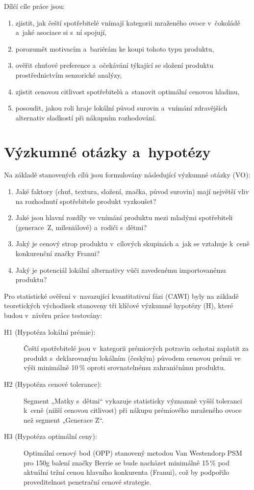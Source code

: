 Dílčí cíle práce jsou:
\begin{enumerate}
  \item zjistit, jak čeští spotřebitelé vnímají kategorii mraženého ovoce v~čokoládě a~jaké asociace si s~ní spojují,
  \item porozumět motivacím a~bariérám ke koupi tohoto typu produktu,
  \item ověřit chuťové preference a~očekávání týkající se složení produktu prostřednictvím senzorické analýzy,
  \item zjistit cenovou citlivost spotřebitelů a~stanovit optimální cenovou hladinu,
  \item posoudit, jakou roli hraje lokální původ surovin a~vnímání zdravějších alternativ sladkostí při nákupním rozhodování.
\end{enumerate}

\section{Výzkumné otázky a~hypotézy}
\label{sec:intro_rq_hyp}

Na základě stanovených cílů jsou formulovány následující výzkumné otázky (VO):
\begin{enumerate}
  \item[\textbf{VO1}] Jaké faktory (chuť, textura, složení, značka, původ surovin) mají největší vliv na rozhodnutí spotřebitele produkt vyzkoušet?
  \item[\textbf{VO2}] Jaké jsou hlavní rozdíly ve vnímání produktu mezi mladými spotřebiteli (generace~Z, mileniálové) a~rodiči s~dětmi?
  \item[\textbf{VO3}] Jaký je cenový strop produktu v~cílových skupinách a~jak se vztahuje k~ceně konkurenční značky Franui?
  \item[\textbf{VO4}] Jaký je potenciál lokální alternativy vůči zavedenému importovanému produktu?
\end{enumerate}

Pro statistické ověření v~navazující kvantitativní fázi (CAWI) byly na základě teoretických východisek stanoveny tři klíčové výzkumné hypotézy (H), které budou v~závěru práce testovány:

\begin{description}
  \item[H1 (Hypotéza lokální prémie):] Čeští spotřebitelé jsou v~kategorii prémiových potravin ochotni zaplatit za produkt s~deklarovaným lokálním (českým) původem cenovou prémii ve výši minimálně 10\,\% oproti srovnatelnému zahraničnímu produktu.
  \item[H2 (Hypotéza cenové tolerance):] Segment „Matky s~dětmi“ vykazuje statisticky významně vyšší toleranci k~ceně (nižší cenovou citlivost) při nákupu prémiového mraženého ovoce než segment „Generace Z“.
  \item[H3 (Hypotéza optimální ceny):] Optimální cenový bod (OPP) stanovený metodou Van Westendorp PSM pro 150g balení značky Berrie se bude nacházet minimálně 15\,\% pod aktuální tržní cenou hlavního konkurenta (Franui), což by podpořilo proveditelnost penetrační cenové strategie.
\end{description}

